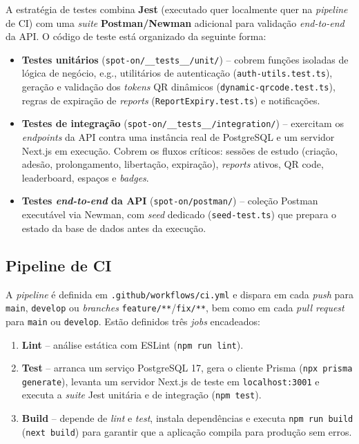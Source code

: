 \documentclass[11pt,a4paper]{article}
\begin{document}
A estratégia de testes combina \textbf{Jest} (executado quer localmente quer
na \emph{pipeline} de CI) com uma \emph{suite} \textbf{Postman/Newman}
adicional para validação \emph{end-to-end} da API. O código de teste está
organizado da seguinte forma:

\begin{itemize}[leftmargin=*]
    \item \textbf{Testes unitários} (\texttt{spot-on/\_\_tests\_\_/unit/}) --
          cobrem funções isoladas de lógica de negócio, e.g., utilitários de
          autenticação (\texttt{auth-utils.test.ts}), geração e validação dos
          \emph{tokens} QR dinâmicos (\texttt{dynamic-qrcode.test.ts}), regras de
          expiração de \emph{reports} (\texttt{ReportExpiry.test.ts}) e
          notificações.
    \item \textbf{Testes de integração}
          (\texttt{spot-on/\_\_tests\_\_/integration/}) -- exercitam os
          \emph{endpoints} da API contra uma instância real de PostgreSQL e um
          servidor Next.js em execução. Cobrem os fluxos críticos: sessões de
          estudo (criação, adesão, prolongamento, libertação, expiração),
          \emph{reports} ativos, QR code, leaderboard, espaços e \emph{badges}.
    \item \textbf{Testes \emph{end-to-end} da API}
          (\texttt{spot-on/postman/}) -- coleção Postman executável via Newman,
          com \emph{seed} dedicado (\texttt{seed-test.ts}) que prepara o estado da
          base de dados antes da execução.
\end{itemize}

\subsection{Pipeline de CI}

A \emph{pipeline} é definida em \texttt{.github/workflows/ci.yml} e dispara
em cada \emph{push} para \texttt{main}, \texttt{develop} ou \emph{branches}
\texttt{feature/**}/\texttt{fix/**}, bem como em cada \emph{pull request} para
\texttt{main} ou \texttt{develop}. Estão definidos três \emph{jobs}
encadeados:

\begin{enumerate}[leftmargin=*]
    \item \textbf{Lint} -- análise estática com ESLint (\texttt{npm run lint}).
    \item \textbf{Test} -- arranca um serviço PostgreSQL 17, gera o cliente
          Prisma (\texttt{npx prisma generate}), levanta um servidor Next.js de
          teste em \texttt{localhost:3001} e executa a \emph{suite} Jest unitária
          e de integração (\texttt{npm test}).
    \item \textbf{Build} -- depende de \emph{lint} e \emph{test}, instala
          dependências e executa \texttt{npm run build} (\texttt{next build}) para
          garantir que a aplicação compila para produção sem erros.
\end{enumerate}
\end{document}
